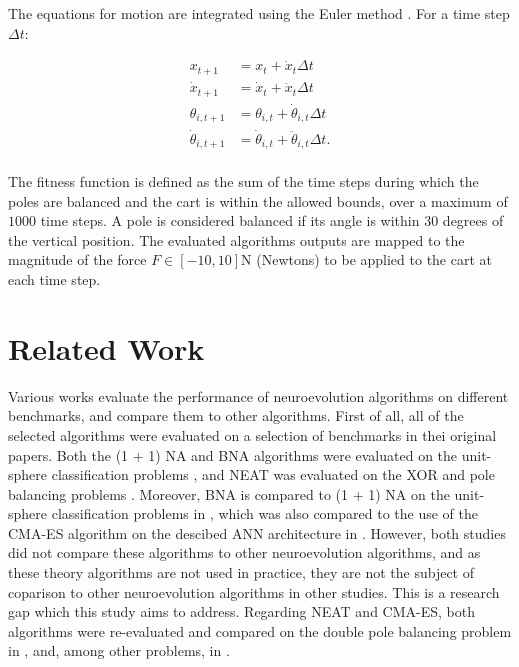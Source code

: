 The equations for motion are integrated using the Euler method \cite{euler}. For a time step $\Delta t$:

\[
    \begin{aligned}
        x_{t+1} &= x_t + \dot{x}_t \Delta t \\
        \dot{x}_{t+1} &= \dot{x}_t + \ddot{x}_t \Delta t \\
        \theta_{i, t+1} &= \theta_{i, t} + \dot{\theta}_{i, t} \Delta t \\
        \dot{\theta}_{i, t+1} &= \dot{\theta}_{i, t} + \ddot{\theta}_{i, t} \Delta t. \\
    \end{aligned}
\]

The fitness function is defined as the sum of the time steps during which the poles are balanced and the cart is within the allowed bounds, over a maximum of $1000$ time steps.
A pole is considered balanced if its angle is within $30$ degrees of the vertical position.
The evaluated algorithms outputs are mapped to the magnitude of the force $F \in [-10, 10]$N (Newtons) to be applied to the cart at each time step.

\section{Related Work}

Various works evaluate the performance of neuroevolution algorithms on different benchmarks, and compare them to other algorithms.
First of all, all of the selected algorithms were evaluated on a selection of benchmarks in thei original papers.
Both the (1 + 1) NA and BNA algorithms were evaluated on the unit-sphere classification problems \cite{na, bna}, and NEAT was evaluated on the XOR and pole balancing problems \cite{neat}.
Moreover, BNA is compared to (1 + 1) NA on the unit-sphere classification problems in \cite{bna}, which was also compared to the use of the CMA-ES algorithm on the descibed ANN architecture in
\cite{na}. However, both studies did not compare these algorithms to other neuroevolution algorithms, and as these theory algorithms are not used in practice, they are not the subject of
coparison to other neuroevolution algorithms in other studies. This is a research gap which this study aims to address.
Regarding NEAT and CMA-ES, both algorithms were re-evaluated and compared on the double pole balancing problem in \cite{neuroevolution_es_rl}, and, among other problems, in \cite{robust}.
